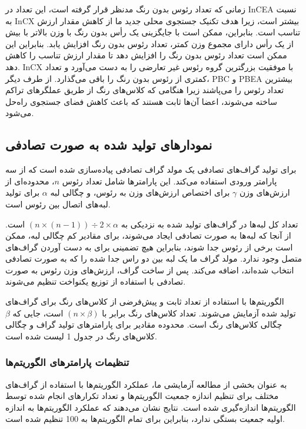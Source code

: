 \documentclass[a4paper,10pt]{article}
\begin{document}
        زمانی که تعداد رئوس بدون رنگ مدنظر قرار گرفته است، این تعداد در InCEA نسبت به InCX بیشتر است، زیرا هدف تکنیک جستجوی محلی جدید ما از کاهش مقدار ارزش تناسب است. بنابراین، ممکن است با جایگزینی یک رأس بدون رنگ با وزن بالاتر با بیش از یک رأس دارای مجموع وزن کمتر، تعداد رئوس بدون رنگ افزایش یابد. بنابراین این ممکن است تعداد رئوس بدون رنگ را افزایش دهد تا مقدار ارزش تناسب را کاهش دهد. InCX با موفقیت بزرگترین گروه رئوس غیر تعارضی را به دست می‌آورد و تعداد کمتری از رئوس بدون رنگ را باقی می‌گذارد. از طرف دیگر، PBC و PBEA بیشترین تعداد رئوس را می‌پاشند زیرا هنگامی که کلاس‌های رنگ از طریق عملگرهای تراکم ساخته می‌شوند، اعضا آن‌ها ثابت هستند که باعث کاهش فضای جستجوی راه‌حل می‌شود.

        \subsection{نمودارهای تولید شده به صورت تصادفی}

            برای تولید گراف‌های تصادفی یک مولد گراف تصادفی پیاده‌سازی شده است که از سه پارامتر ورودی استفاده می‌کند. این پارامترها شامل تعداد رئوس $n$، محدوده‌ای از ارزش‌های وزن $\gamma$ برای اختصاص ارزش‌های وزن به رئوس، و چگالی لبه $\alpha$ برای تولید لبه‌های اتصال بین رئوس است.

            تعداد کل لبه‌ها در گراف‌های تولید شده به نزدیکی به 
            $(n \times (n-1)) \div 2 \times \alpha$
            است. از آنجا که لبه‌ها به صورت تصادفی ایجاد می‌شوند، برای مقادیر کم چگالی لبه، ممکن است برخی از رئوس جدا شوند، بنابراین هیچ تضمینی برای به دست آوردن گراف‌های متصل وجود ندارد. مولد گراف ما یک لبه بین دو راس جدا شده را که به صورت تصادفی انتخاب شده‌اند، اضافه می‌کند. پس از ساخت گراف، ارزش‌های وزن رئوس به صورت تصادفی با استفاده از توزیع یکنواخت تنظیم می‌شوند.

            الگوریتم‌ها با استفاده از تعداد ثابت و پیش‌فرضی از کلاس‌های رنگ برای گراف‌های تولید شده آزمایش می‌شوند. تعداد کلاس‌های رنگ برابر با $(n \times \beta)$ است، جایی که $\beta$ چگالی کلاس‌های رنگ است. محدوده مقادیر برای پارامترهای تولید گراف و چگالی کلاس‌های رنگ در جدول 1 لیست شده است.

            \subsubsection{تنظیمات پارامترهای الگوریتم‌ها}

                به عنوان بخشی از مطالعه آزمایشی ما، عملکرد الگوریتم‌ها با استفاده از گراف‌های مختلف برای تنظیم اندازه جمعیت الگوریتم‌ها و تعداد تکرارهای انجام شده توسط الگوریتم‌ها اندازه‌گیری شده است. نتایج نشان می‌دهند که عملکرد الگوریتم‌ها به اندازه اولیه جمعیت بستگی ندارد، بنابراین برای تمام الگوریتم‌ها به 100 تنظیم شده است.
\end{document}
